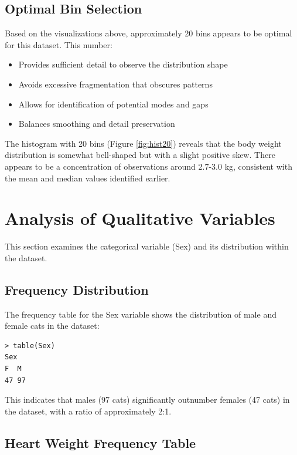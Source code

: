 \documentclass[a4paper,12pt]{article}
\begin{document}
\subsection{Optimal Bin Selection}
\label{subsec:optimal_bins}

Based on the visualizations above, approximately 20 bins appears to be optimal for this dataset. This number:
\begin{itemize}[leftmargin=1.5cm]
    \item Provides sufficient detail to observe the distribution shape
    \item Avoids excessive fragmentation that obscures patterns
    \item Allows for identification of potential modes and gaps
    \item Balances smoothing and detail preservation
\end{itemize}

The histogram with 20 bins (Figure \ref{fig:hist20}) reveals that the body weight distribution is somewhat bell-shaped but with a slight positive skew. There appears to be a concentration of observations around 2.7-3.0 kg, consistent with the mean and median values identified earlier.

\section{Analysis of Qualitative Variables}
\label{sec:qualitative}

This section examines the categorical variable (Sex) and its distribution within the dataset.

\subsection{Frequency Distribution}
\label{subsec:frequency}

The frequency table for the Sex variable shows the distribution of male and female cats in the dataset:

\begin{lstlisting}[caption={Frequency table for Sex variable}, label={lst:sex_freq}]
> table(Sex)
Sex
F  M
47 97
\end{lstlisting}

This indicates that males (97 cats) significantly outnumber females (47 cats) in the dataset, with a ratio of approximately 2:1.

\subsection{Heart Weight Frequency Table}
\label{subsec:hwt_freq}
\end{document}
